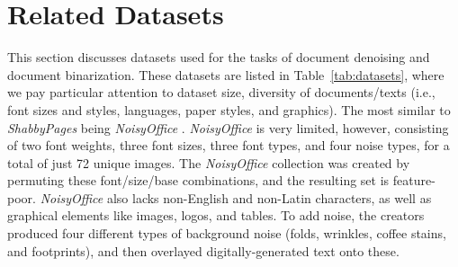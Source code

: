 \documentclass[runningheads]{llncs}
\begin{document}
\section{Related Datasets}
This section discusses datasets used for the tasks of document denoising and document binarization.
These datasets are listed in Table~\ref{tab:datasets}, where we pay particular attention to dataset size, diversity of documents/texts (i.e., font sizes and styles, languages, paper styles, and graphics).
The most similar to \emph{ShabbyPages} being \emph{NoisyOffice} \cite{ref_NoisyOfficeDatabase}.
\emph{NoisyOffice} is very limited, however, consisting of two font weights, three font sizes, three font types, and four noise types, for a total of just 72 unique images.
The \emph{NoisyOffice} collection was created by permuting these font/size/base combinations, and the resulting set is feature-poor.
\emph{NoisyOffice} also lacks non-English and non-Latin characters, as well as graphical elements like images, logos, and tables.
To add noise, the creators produced four different types of background noise (folds, wrinkles, coffee stains, and footprints), and then overlayed digitally-generated text onto these.
\end{document}
